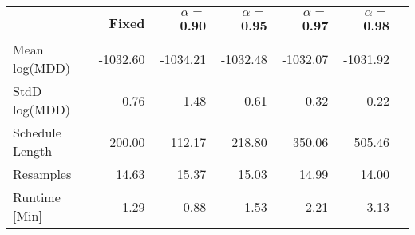 \begin{tabular} {lrrrrrr} 
 \hline \hline 
&Fixed&$\alpha = $0.90&$\alpha = $0.95&$\alpha = $0.97&$\alpha = $0.98\\ 
 \hline 
Mean log(MDD)&-1032.60&-1034.21&-1032.48&-1032.07&-1031.92\\ 
StdD log(MDD)&0.76&1.48&0.61&0.32&0.22\\ 
Schedule Length&200.00&112.17&218.80&350.06&505.46\\ 
Resamples&14.63&15.37&15.03&14.99&14.00\\ 
Runtime [Min]&1.29&0.88&1.53&2.21&3.13\\ 
\hline 
\end{tabular}